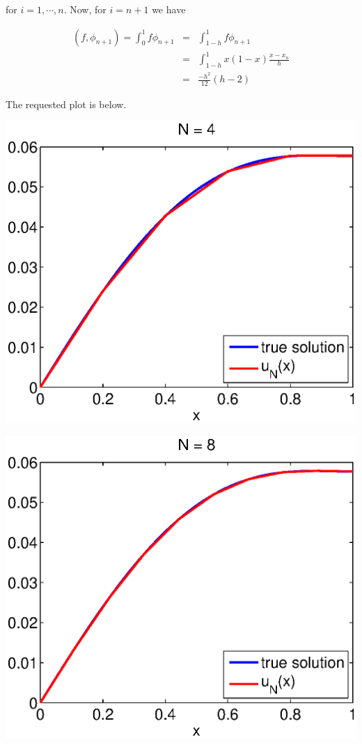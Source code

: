 {\begin{solution}
\begin{enumerate}
for $i= 1, \cdots, n$. Now, for $i=n+1$ we have 


\begin{eqnarray*}
(f,\phi_{n+1})= \int_0^1 f \phi_{n+1} &=& \int_{1-h}^{1} f \phi_{n+1} \\
																		&=& \int_{1-h}^{1} x(1-x) \frac{x-x_{n}}{h}\\
																		&=& \frac{-h^2}{12}(h-2)																		
\end{eqnarray*}

The requested plot is below.

\begin{center}\includegraphics[scale=0.7]{hw92c.eps}\end{center}
\begin{center}\includegraphics[scale=0.7]{hw92c8.eps}\end{center}


\end{enumerate}
\end{solution}}
